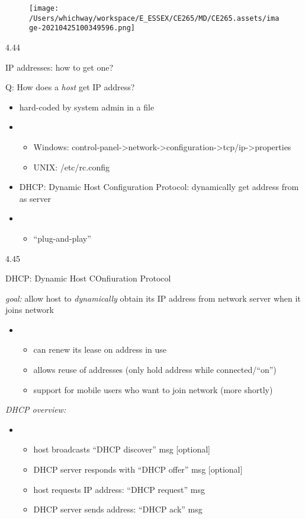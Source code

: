 \documentclass[
]{article}
\begin{document}
\begin{figure}
\centering
\texttt{[image: /Users/whichway/workspace/E\_ESSEX/CE265/MD/CE265.assets/image-20210425100349596.png]}
\caption{}
\end{figure}

4.44

IP addresses: how to get one?

Q: How does a \emph{host} get IP address?

\begin{itemize}
\item
  hard-coded by system admin in a file
\item
  \begin{itemize}
  \item
    Windows:
    control-panel-\textgreater network-\textgreater configuration-\textgreater tcp/ip-\textgreater properties
  \item
    UNIX: /etc/rc.config
  \end{itemize}
\item
  DHCP: Dynamic Host Configuration Protocol: dynamically get address
  from as server
\item
  \begin{itemize}
  \item
    ``plug-and-play''
  \end{itemize}
\end{itemize}

4.45

DHCP: Dynamic Host COnfiuration Protocol

\emph{goal:} allow host to \emph{dynamically} obtain its IP address from
network server when it joins network

\begin{itemize}
\item
  \begin{itemize}
  \item
    can renew its lease on address in use
  \item
    allows reuse of addresses (only hold address while connected/``on'')
  \item
    support for mobile users who want to join network (more shortly)
  \end{itemize}
\end{itemize}

\emph{DHCP overview:}

\begin{itemize}
\item
  \begin{itemize}
  \item
    host broadcasts ``DHCP discover'' msg {[}optional{]}
  \item
    DHCP server responds with ``DHCP offer'' msg {[}optional{]}
  \item
    host requests IP address: ``DHCP request'' msg
  \item
    DHCP server sends address: ``DHCP ack'' msg
  \end{itemize}
\end{itemize}
\end{document}
